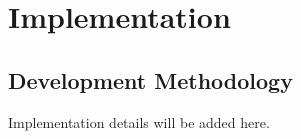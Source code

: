 \chapter{Implementation}
\section{Development Methodology}
Implementation details will be added here.
